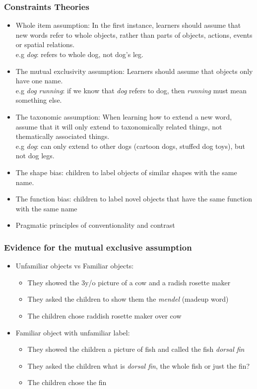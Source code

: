 \documentclass{beamer}
\begin{document}
\begin{frame}
\frametitle{Constraints Theories}
\begin{itemize}
\item Whole item assumption: In the first instance, learners should assume that new words refer to whole objects, rather than parts of objects, actions, events or spatial relations. 
\\ e.g \textit{dog}: refers to whole dog, not dog's leg.
\pause
\item The mutual exclusivity assumption: Learners should assume that objects only have one name. 
\\ e.g \textit{dog running}: if we know that \textit{dog} refers to dog, then \textit{running} must mean something else. 
\pause
\item The taxonomic assumption: When learning how to extend a new word, assume that it will only extend to taxonomically related things, not thematically associated things.
\\ e.g \textit{dog}: can only extend to other dogs (cartoon dogs, stuffed dog toys), but not dog legs.
\item The shape bias: children to label objects of similar shapes with the same name.
\item The function bias: children to label novel objects that have the same function with the same name
\item Pragmatic principles of conventionality and contrast
\end{itemize}
\end{frame}
\begin{frame}
\frametitle{Evidence for the mutual exclusive assumption}
\begin{itemize}
\item Unfamiliar objects vs Familiar objects:
\begin{itemize}
    \item They showed the 3y/o picture of a cow and a radish rosette maker
    \item They asked the children to show them the \textit{mendel} (madeup word)
    \item The children chose raddish rosette maker over cow
\end{itemize}
\pause
\item Familiar object with unfamiliar label:
\begin{itemize}
    \item They showed the children a picture of fish and called the fish \textit{dorsal fin}
    \item They asked the children what is \textit{dorsal fin}, the whole fish or just the fin?
    \item The children chose the fin
\end{itemize}
\end{itemize}
\end{frame}
\end{document}
